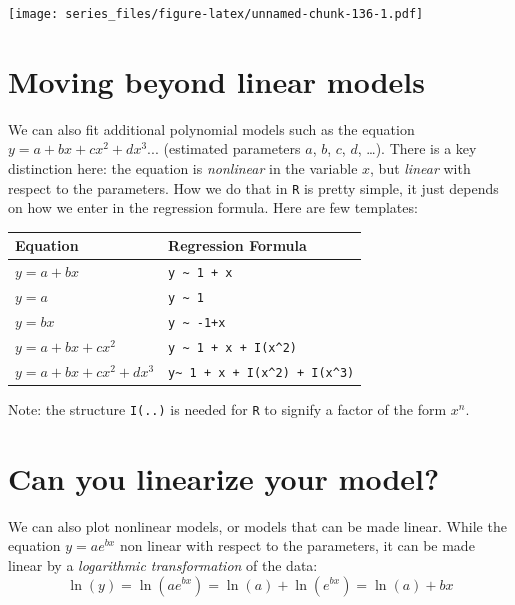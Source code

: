 \documentclass[
]{book}
\theoremstyle{definition}
\theoremstyle{definition}
\theoremstyle{definition}
\theoremstyle{remark}
\begin{document}
\texttt{[image: series\_files/figure-latex/unnamed-chunk-136-1.pdf]}

\hypertarget{moving-beyond-linear-models}{%
\section{Moving beyond linear models}\label{moving-beyond-linear-models}}

We can also fit additional polynomial models such as the equation
\(y = a + bx + cx^{2} + dx^{3} ...\) (estimated parameters \(a\), \(b\), \(c\), \(d\), \ldots). There is a key distinction here: the equation is \emph{nonlinear} in the variable \(x\), but \emph{linear} with respect to the parameters. How we do that in \texttt{R} is pretty simple, it just depends on how we enter in the regression formula. Here are few templates:

\begin{longtable}[]{@{}ll@{}}
\toprule
\textbf{Equation} & \textbf{Regression Formula} \\
\midrule
\endhead
\(y=a+bx\) & \texttt{y\ \textasciitilde{}\ 1\ +\ x} \\
\(y=a\) & \texttt{y\ \textasciitilde{}\ 1} \\
\(y=bx\) & \texttt{y\ \textasciitilde{}\ -1+x} \\
\(y=a+bx+cx^{2}\) & \texttt{y\ \textasciitilde{}\ 1\ +\ x\ +\ I(x\^{}2)} \\
\(y=a+bx+cx^{2}+dx^{3}\) & \texttt{y\textasciitilde{}\ 1\ +\ x\ +\ I(x\^{}2)\ +\ I(x\^{}3)} \\
\bottomrule
\end{longtable}

Note: the structure \texttt{I(..)} is needed for \texttt{R} to signify a factor of the form \(x^{n}\).

\hypertarget{can-you-linearize-your-model}{%
\section{Can you linearize your model?}\label{can-you-linearize-your-model}}

We can also plot nonlinear models, or models that can be made linear. While the equation \(y=ae^{bx}\) non linear with respect to the parameters, it can be made linear by a \emph{logarithmic transformation} of the data:
\begin{equation}
\ln(y) = \ln(ae^{bx}) = \ln(a) + \ln (e^{bx}) = \ln(a) + bx
\end{equation}
\end{document}

